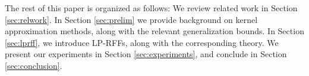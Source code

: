 The rest of this paper is organized as follows: We review related work in Section \ref{sec:relwork}.  In Section \ref{sec:prelim} we provide background on kernel approximation methods, along with the relevant generalization bounds. In Section \ref{sec:lprff}, we introduce LP-RFFs, along with the corresponding theory.  We present our experiments in Section \ref{sec:experiments}, and conclude in Section \ref{sec:conclusion}.


